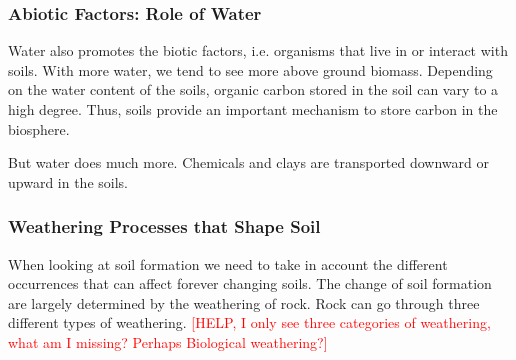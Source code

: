 \subsubsection{Abiotic Factors: Role of Water}

Water also promotes the biotic factors, i.e. organisms that live in or interact with soils. With more water, we tend to see more above ground biomass. Depending on the water content of the soils, organic carbon stored in the soil can vary to a high degree.  Thus, soils provide an important mechanism to store carbon in the biosphere.


But water does much more. Chemicals and clays are transported downward or upward in the soils.
 



\subsubsection{Weathering Processes that Shape Soil}

When looking at soil formation we need to take in account the different occurrences that can affect forever changing soils. The change of soil formation are largely determined by the weathering of rock. Rock can go through three different types of weathering. \textcolor{red}{[HELP, I only see three categories of weathering, what am I missing? Perhaps Biological weathering?]}

